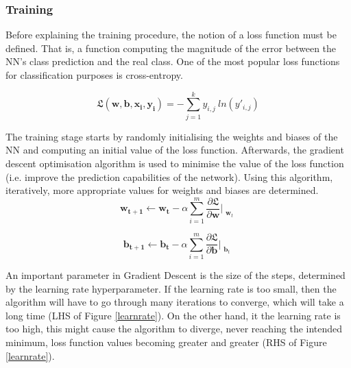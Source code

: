 \subsubsection*{Training}

Before explaining the training procedure, the notion of a loss function must be defined. That is, a function computing the magnitude of the error between the NN's class prediction and the real class. One of the most popular loss functions for classification purposes is cross-entropy.

\begin{equation}
  \mathbf{\mathfrak{L}}(\mathbf{w}, \mathbf{b}, \mathbf{x_i}, \mathbf{y_i}) = - \sum_{j=1}^k y_{i,j} \ ln(y'_{i,j})
\end{equation}

The training stage starts by randomly initialising the weights and biases of the NN and computing an initial value of the loss function. Afterwards, the gradient descent optimisation algorithm is used to minimise the value of the loss function (i.e. improve the prediction capabilities of the network). Using this algorithm, iteratively, more appropriate values for weights and biases are determined. \\

\begin{equation}
  \mathbf{w_{t+1}} \leftarrow \mathbf{w_t} - \alpha \sum_{i=1}^m \frac{\partial \mathfrak{L}}{\partial \mathbf{w}}\Bigr|_{\substack{\mathbf{w}_t}}
\end{equation}

\begin{equation}
  \mathbf{b_{t+1}} \leftarrow \mathbf{b_t} - \alpha \sum_{i=1}^m \frac{\partial \mathfrak{L}}{\partial \mathbf{b}}\Bigr|_{\substack{\mathbf{b}_t}}
\end{equation}

\bigskip

An important parameter in Gradient Descent is the size of the steps, determined by the learning rate hyperparameter. If the learning rate is too small, then the algorithm will have to go through many iterations to converge, which will take a long time (LHS of Figure \ref{learnrate}). On the other hand, it the learning rate is too high, this might cause the algorithm to diverge, never reaching the intended minimum, loss function values becoming greater and greater (RHS of Figure \ref{learnrate}). \\


